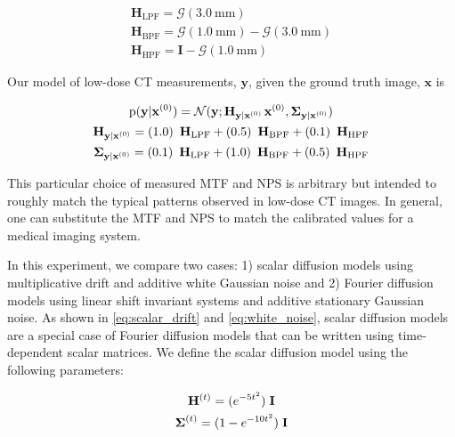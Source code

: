 \documentclass[12pt,]{article}
\begin{document}
\begin{gather}
    \mathbf{H}_\text{LPF} = \boldsymbol{\mathcal{G}}(3.0~\text{mm}) \\
    \mathbf{H}_\text{BPF} = \boldsymbol{\mathcal{G}}(1.0~\text{mm}) - \boldsymbol{\mathcal{G}}(3.0~\text{mm}) \\
    \mathbf{H}_\text{HPF} = \mathbf{I} - \boldsymbol{\mathcal{G}}(1.0~\text{mm}) 
\end{gather}

\noindent Our model of low-dose CT measurements, $\mathbf{y}$, given the ground truth image, $\mathbf{x}$ is

\begin{gather}
    \text{p}(\mathbf{y}|\mathbf{x}^{(0)}) = \mathcal{N}(\mathbf{y}; \mathbf{H}_{\mathbf{y}|\mathbf{x}^{(0)}} \hspace{0.5mm} \mathbf{x}^{(0)}, \boldsymbol{\Sigma}_{\mathbf{y}|\mathbf{x}^{(0)}})\\
    \mathbf{H}_{\mathbf{y}|\mathbf{x}^{(0)}} = (1.0) \enspace \mathbf{H}_\text{LPF}  + (0.5) \enspace \mathbf{H}_\text{BPF}  + (0.1) \enspace \mathbf{H}_\text{HPF} \\ 
    \boldsymbol{\Sigma}_{\mathbf{y}|\mathbf{x}^{(0)}} = (0.1) \enspace \mathbf{H}_\text{LPF}  + (1.0) \enspace \mathbf{H}_\text{BPF}  + (0.5) \enspace \mathbf{H}_\text{HPF}  
\end{gather}

\noindent This particular choice of measured MTF and NPS is arbitrary but intended to roughly match the typical patterns observed in low-dose CT images. In general, one can substitute the MTF and NPS to match the calibrated values for a medical imaging system.

In this experiment, we compare two cases: 1) scalar diffusion models using multiplicative drift and additive white Gaussian noise and 2) Fourier diffusion models using linear shift invariant systems and additive stationary Gaussian noise. As shown in \eqref{eq:scalar_drift} and \eqref{eq:white_noise}, scalar diffusion models are a special case of Fourier diffusion models that can be written using time-dependent scalar matrices. We define the scalar diffusion model using the following parameters:

\begin{gather}
    \mathbf{H}^{(t)} = (e^{-  
 5t^2})\hspace{1mm} \mathbf{I} \label{eq:scalar_diffusion_model_drift}\\
    \boldsymbol{\Sigma}^{(t)} = (1 - e^{- 10 t^2}) \hspace{1mm} \mathbf{I} \label{eq:scalar_diffusion_model_noise}
\end{gather}
\end{document}
